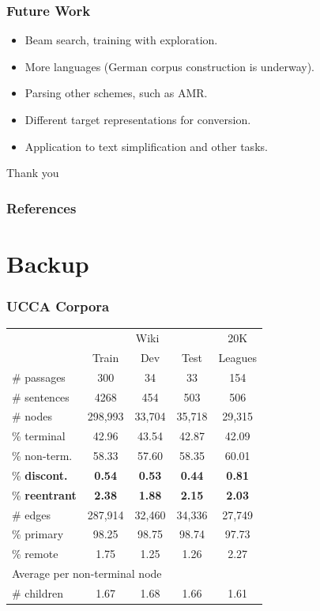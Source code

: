 \documentclass[t]{beamer}
\begin{document}
\begin{frame}
\frametitle{Future Work}
\begin{itemize}
 \item Beam search, training with exploration.
 \item More languages (German corpus construction is underway).
 \item Parsing other schemes, such as AMR.
 \item Different target representations for conversion.
 \item Application to text simplification and other tasks.
\end{itemize}
\end{frame}



\begin{frame}
\vfill
\begin{center}
\LARGE
Thank you
\end{center}
\end{frame}



\begin{frame}[allowframebreaks]
\frametitle{References}

\tiny
\end{frame}


\section{Backup}


\begin{frame}
\frametitle{UCCA Corpora}
\centering
\begin{tabular}{l|ccc|c}
	& \multicolumn{3}{c|}{Wiki} & 20K \\
	& \small Train & \small Dev & \small Test & Leagues \\
	\hline
	\# passages & 300 & 34 & 33 & 154 \\
	\# sentences & 4268 & 454 & 503 & 506 \\
	\hline
	\# nodes & 298,993 & 33,704 & 35,718 & 29,315 \\
	\% terminal & 42.96 & 43.54 & 42.87 & 42.09 \\
	\% non-term. & 58.33 & 57.60 & 58.35 & 60.01 \\
	\% \textbf{discont.} & \textbf{0.54} & \textbf{0.53} & \textbf{0.44} & \textbf{0.81} \\
	\% \textbf{reentrant} & \textbf{2.38} & \textbf{1.88} & \textbf{2.15} & \textbf{2.03} \\
	\hline
	\# edges & 287,914 & 32,460 & 34,336 & 27,749 \\
	\% primary & 98.25 & 98.75 & 98.74 & 97.73 \\
	\% remote & 1.75 & 1.25 & 1.26 & 2.27 \\
	\hline
	\multicolumn{3}{l}{\footnotesize Average per non-terminal node} \\
	\# children & 1.67 & 1.68 & 1.66 & 1.61 
\end{tabular}
\end{frame}
\end{document}
